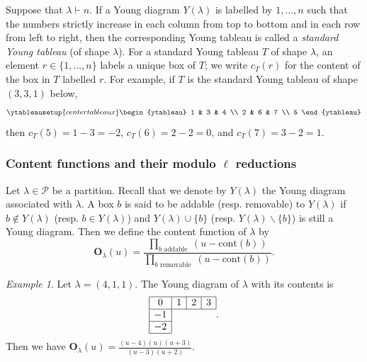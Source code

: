 \documentclass[12pt]{amsart}
\numberwithin{itemcounter}{subsection}
\theoremstyle{plain}
\theoremstyle{definition}
\theoremstyle{remark}
\newtheorem{example}[theorem]{Example}
\numberwithin{equation}{section}
\def\scrP{\mathscr{P}}
\def\bfO{\mathbf{O}}
\begin{document}
							Suppose that $\lambda \vdash n$. If a Young diagram $Y(\lambda)$ is labelled by $1,\ldots,n$ such that the numbers strictly increase in each column from top to bottom and in each row from left to right, then the corresponding Young tableau is called a \emph{standard Young tableau} (of shape $\lambda$). For a standard Young tableau $T$ of shape $\lambda$, an element $r \in \{1,\ldots,n\}$ labels a unique box of $T$; we write $c_T(r)$ for the content of the box in $T$ labelled $r$. For example, if $T$ is the standard Young tableau of shape $(3,3,1)$ below,
							\begin{align*}
								\ytableausetup{centertableaux}\begin{ytableau}
									1 & 3 & 4 \\
									2 & 6 & 7 \\
									5
								\end{ytableau}
							\end{align*}
							\noindent
							then $c_T(5) = 1-3 = -2$, $c_T(6) = 2-2 = 0$, and $c_T(7) = 3-2 = 1$.

							\subsubsection{Content functions and their modulo $\ell$ reductions}\label{sub:contentfunction}
							Let $\lambda\in \scrP$ be a partition. Recall that we denote by $Y(\lambda)$ the Young diagram associated with $\lambda$. A box $b$ is said to be addable (resp. removable) to $Y(\lambda)$ if $b\notin Y(\lambda)$ (resp. $b\in Y(\lambda)$) and $Y(\lambda)\cup \{b\}$ (resp. $Y(\lambda)\backslash \{b\}$) is still a Young diagram.
							Then we define the content function of $\lambda$ by
							$$\bfO_{\lambda}(u)=\frac{\prod\limits_{\text{$b$  addable }}(u-\text{cont}(b))}{\prod\limits_{\text{$b$  removable }}(u-\text{cont}(b))}.$$

							\begin{example}
								Let $\lambda=(4,1,1)$.
								The Young diagram of $\lambda$ with its  contents is
								$$
								\begin{array}{|c|c|c|c|}
									\hline
									0& 1  &2 &3   \\
									\hline
									-1 \\
									\cline{1-1}
									-2 \\
									\cline{1-1}
								\end{array}.$$
								Then we have  $\bfO_{\lambda}(u)=\frac
								{(u-4)(u)(u+3)}{(u-3)(u+2)}.$
							\end{example}
\end{document}
